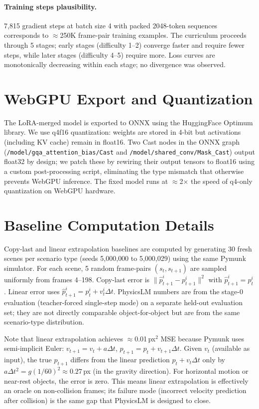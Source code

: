 \documentclass{article}
\begin{document}
\paragraph{Training steps plausibility.}
7,815 gradient steps at batch size 4 with packed 2048-token sequences corresponds
to $\approx$250K frame-pair training examples. The curriculum proceeds through
5 stages; early stages (difficulty 1--2) converge faster and require fewer steps,
while later stages (difficulty 4--5) require more. Loss curves are monotonically
decreasing within each stage; no divergence was observed.

\section{WebGPU Export and Quantization}
\label{app:webgpu}

The LoRA-merged model is exported to ONNX using the HuggingFace Optimum library.
We use q4f16 quantization: weights are stored in 4-bit but activations (including
KV cache) remain in float16. Two Cast nodes in the ONNX graph
(\texttt{/model/gqa\_attention\_bias/Cast} and \texttt{/model/shared\_conv/Mask\_Cast})
output float32 by design; we patch these by rewiring their output tensors to float16
using a custom post-processing script, eliminating the type mismatch that otherwise
prevents WebGPU inference. The fixed model runs at $\approx$2$\times$ the speed
of q4-only quantization on WebGPU hardware.

\section{Baseline Computation Details}
\label{app:baselines}

Copy-last and linear extrapolation baselines are computed by generating 30 fresh scenes
per scenario type (seeds 5{,}000{,}000 to 5{,}000{,}029) using the same Pymunk
simulator. For each scene, 5 random frame-pairs $(s_t, s_{t+1})$ are sampled
uniformly from frames 4--198. Copy-last error is
$\|\hat{p}^i_{t+1} - p^i_{t+1}\|^2$ with $\hat{p}^i_{t+1} = p^i_t$.
Linear error uses $\hat{p}^i_{t+1} = p^i_t + v^i_t \Delta t$.
PhysicsLM numbers are from the stage-0 evaluation (teacher-forced single-step mode)
on a separate held-out evaluation set; they are not directly comparable object-for-object
but are from the same scenario-type distribution.

Note that linear extrapolation achieves $\approx$0.01\,px$^2$ MSE because Pymunk
uses semi-implicit Euler: $v_{t+1} = v_t + a\Delta t$, $p_{t+1} = p_t + v_{t+1}\Delta t$.
Given $v_t$ (available as input), the true $p_{t+1}$ differs from the linear prediction
$p_t + v_t \Delta t$ only by $a\Delta t^2 = g(1/60)^2 \approx 0.27$\,px (in the
gravity direction). For horizontal motion or near-rest objects, the error is zero.
This means linear extrapolation is effectively an oracle on non-collision frames;
its failure mode (incorrect velocity prediction after collision) is the same gap
that PhysicsLM is designed to close.
\end{document}
